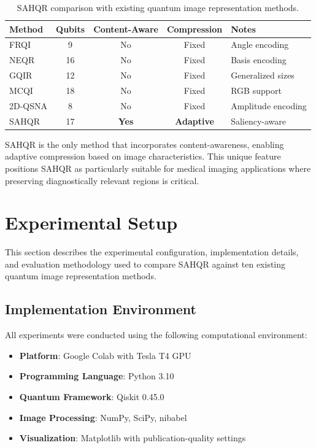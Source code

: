 \documentclass{ipol}
\begin{document}
\begin{table}[!htbp]
\caption{SAHQR comparison with existing quantum image representation methods.}
\label{tab:sahqr_comparison}
\centering
\begin{tabular}{@{}lcccl@{}}
\toprule
Method & Qubits & Content-Aware & Compression & Notes \\
\midrule
FRQI & 9 & No & Fixed & Angle encoding \\
NEQR & 16 & No & Fixed & Basis encoding \\
GQIR & 12 & No & Fixed & Generalized sizes \\
MCQI & 18 & No & Fixed & RGB support \\
2D-QSNA & 8 & No & Fixed & Amplitude encoding \\
SAHQR & 17 & \textbf{Yes} & \textbf{Adaptive} & Saliency-aware \\
\bottomrule
\end{tabular}
\end{table}

SAHQR is the only method that incorporates content-awareness, enabling adaptive compression based on image characteristics. This unique feature positions SAHQR as particularly suitable for medical imaging applications where preserving diagnostically relevant regions is critical.

\section{Experimental Setup}\label{sec:experiments}

This section describes the experimental configuration, implementation details, and evaluation methodology used to compare SAHQR against ten existing quantum image representation methods.

\subsection{Implementation Environment}

All experiments were conducted using the following computational environment:

\begin{itemize}
\item \textbf{Platform}: Google Colab with Tesla T4 GPU
\item \textbf{Programming Language}: Python 3.10
\item \textbf{Quantum Framework}: Qiskit 0.45.0~\cite{bib70}
\item \textbf{Image Processing}: NumPy, SciPy, nibabel
\item \textbf{Visualization}: Matplotlib with publication-quality settings~\cite{bib71}
\end{itemize}
\end{document}
